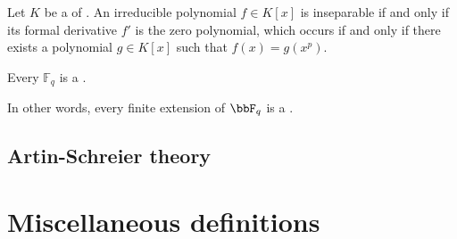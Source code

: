 \begin{lemma} \label{lemma:irreducible_poly_in_char_p_field_is_insep_iff_formal_derivative_is_zero}
Let $K$ be a  of .
An irreducible polynomial $f \in K[x]$ is inseparable if and only if its formal derivative $f'$ is the zero polynomial, which occurs if and only if there exists a polynomial $g \in K[x]$ such that $f(x) = g(x^p)$.
\end{lemma}

\begin{theorem} \label{theorem:finite_fields_are_perfect}
Every  $\mathbb{F}_q$ is a .

In other words, every finite extension of $\bbF_q$ is a .
\end{theorem}


\subsection{Artin-Schreier theory}




\appendix
\section{Miscellaneous definitions}















